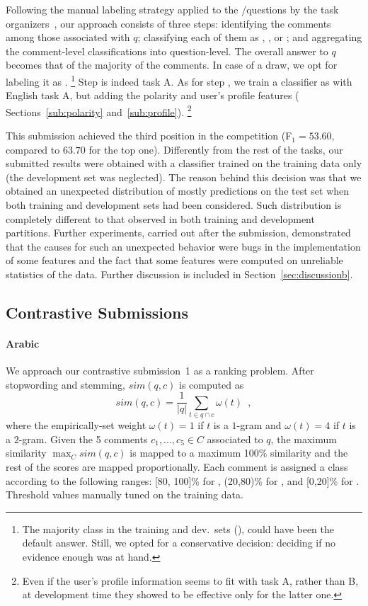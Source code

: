 Following the manual labeling strategy applied to the \yes/\no questions by the 
task organizers~\cite{Marquez-EtAl:2015:SemEval}, our approach consists of three 
steps:
\Ni identifying the \good comments among those associated with $q$;
\Nii classifying each of them as \yes, \no, or \unsure; and 
\Niii aggregating the comment-level classifications into question-level. The 
overall answer to $q$ becomes that of the majority of the comments. In case of a
draw, we opt for labeling it as \unsure.%
\footnote{The majority class in the training and dev.\ sets (\yes), could have 
been the default answer. Still, we opted for a conservative decision: deciding 
\unsure if no evidence enough was at hand.}
Step \Ni is indeed task A. As for step \Nii, we train a classifier as with English task A, 
but adding the polarity and user's profile features (\cf 
Sections~\ref{sub:polarity} and~\ref{sub:profile}).%
\footnote{Even if the user's profile information seems to fit with task A, 
rather than B, at development time they showed to be effective only for the 
latter one.}

This submission achieved the third position in the competition (F$_1=53.60$, 
compared to $63.70$ for the top one). Differently from the rest of the tasks, our 
submitted results were obtained with a classifier trained on the training data 
only (the development set was neglected). The reason behind this decision was 
that we obtained an unexpected distribution of mostly \yes predictions on the 
test set when both training and development sets had been considered. Such 
distribution is completely different to that observed in both training and 
development partitions. Further experiments, carried out after the submission, 
demonstrated that the causes for such an unexpected behavior were bugs in the 
implementation of some features and the fact that some features were computed on 
unreliable statistics of the data. Further discussion is included in 
Section~\ref{sec:discussionb}.


\subsection{Contrastive Submissions}
\label{sub:contrastive}

\paragraph{Arabic} 

We approach our contrastive submission~1 as a ranking problem. After 
stopwording and stemming, $sim(q,c)$ is computed as 
\begin{equation}
 sim(q,c) = \frac{1}{|q|} \sum_{t\in q\cap c} \omega(t) \enspace ,
 \label{eq:overlap}
\end{equation}
% 
where the empirically-set weight $\omega(t)=1$ if $t$ is a $1$-gram and 
$\omega(t)=4$ if $t$ is a $2$-gram. Given the 5 comments $c_1,\ldots,c_5\in C$ 
associated to $q$, the maximum similarity $\max_C sim(q,c)$ is mapped to a 
maximum 100\% similarity and the rest of the scores are mapped proportionally. 
Each comment is assigned a class according to the following ranges: [80, 100]\% 
for \dir, (20,80)\% for \rel, and [0,20]\% for \irel. Threshold values manually 
tuned on the training data.


